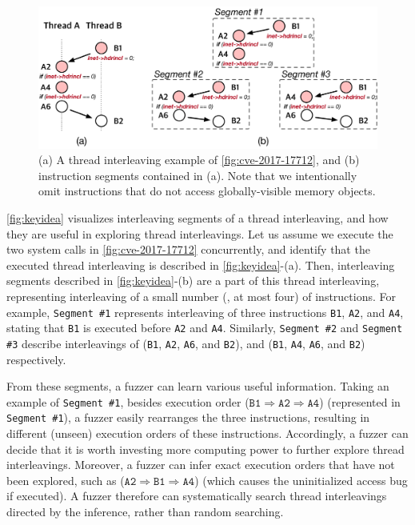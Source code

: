 %
\begin{figure}[t]
  \centering
  \includegraphics[width=0.99\linewidth]{fig/intuition.pdf}
  \caption{(a) A thread interleaving example of
    \autoref{fig:cve-2017-17712}, and (b) instruction segments
    contained in (a).  Note that we intentionally omit instructions
    that do not access globally-visible memory objects.}
  \label{fig:keyidea}
\end{figure}
%
\autoref{fig:keyidea} visualizes interleaving segments of a thread
interleaving, and how they are useful in exploring thread
interleavings.
%
Let us assume we execute the two system calls in
\autoref{fig:cve-2017-17712} concurrently, and identify that the
executed thread interleaving is described in
\autoref{fig:keyidea}-(a).
%
Then, interleaving segments described in \autoref{fig:keyidea}-(b) are
a part of this thread interleaving, representing interleaving of a
small number (\eg, at most four) of instructions.
%
For example, \texttt{Segment \#1} represents interleaving of three
instructions \texttt{B1}, \texttt{A2}, and \texttt{A4}, stating that
\texttt{B1} is executed before \texttt{A2} and \texttt{A4}.
%
Similarly, \texttt{Segment \#2} and \texttt{Segment \#3} describe
interleavings of (\texttt{B1}, \texttt{A2}, \texttt{A6}, and
\texttt{B2}), and (\texttt{B1}, \texttt{A4}, \texttt{A6}, and
\texttt{B2}) respectively.



From these segments, a fuzzer can learn various useful information.
%
Taking an example of \texttt{Segment \#1}, besides execution order
($\texttt{B1} \Rightarrow \texttt{A2} \Rightarrow \texttt{A4}$)
(represented in \texttt{Segment \#1}), a fuzzer easily rearranges the
three instructions, resulting in different (unseen) execution orders
of these instructions.
%
Accordingly, a fuzzer can decide that it is worth investing more
computing power to further explore thread interleavings.
%
Moreover, a fuzzer can infer exact execution orders that have not been
explored, such as
($\texttt{A2} \Rightarrow \texttt{B1} \Rightarrow \texttt{A4}$) (which
causes the uninitialized access bug if executed).
%
A fuzzer therefore can systematically search thread interleavings
directed by the inference, rather than random searching.






